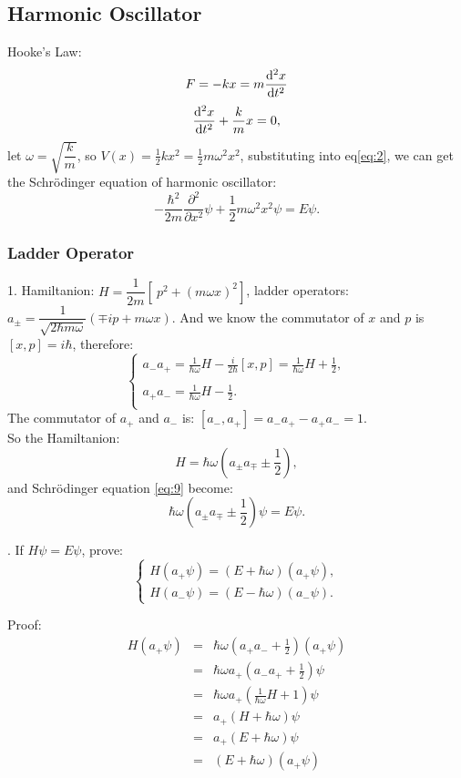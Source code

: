 \documentclass[12pt, 
]{article}
\begin{document}
	\subsection{Harmonic Oscillator}
	Hooke's Law:
	\[
		F=-kx=m\frac{{\rm d}^2x}{{\rm d}t^2}	
	\]
	\[
		\frac{{\rm d}^2 x}{{\rm d}t^2}+\frac{k}{m}x=0,
	\]
	let $\omega=\sqrt{\dfrac{k}{m}}$, so $\displaystyle V(x)=\frac{1}{2}kx^2=\frac{1}{2}m\omega^2x^2$, substituting into eq\eqref{eq:2}, we can get the Schr\"odinger equation of harmonic oscillator:
	\begin{equation}\label{eq:9}
		-\frac{\hbar^2}{2m}\frac{\partial^2}{\partial x^2}\psi+\frac{1}{2}m\omega^2x^2\psi=E\psi.
	\end{equation}
	
	\subsubsection{Ladder Operator}
	1. Hamiltanion: $H=\dfrac{1}{2m}[~p^2+(m\omega x)^2]$, ladder operators: $a_\pm=\dfrac{1}{\sqrt{2\hbar m\omega}}(\mp ip+m\omega x).$
	And we know the commutator of $x$ and $p$ is $[x,p]=i\hbar$, therefore:
	\[
		\left\{
		\begin{array}{l}
			a_{-}a_{+}=\displaystyle \frac{1}{\hbar\omega}H-\frac{i}{2\hbar}[x,p]=\frac{1}{\hbar\omega}H+\frac{1}{2},\\
			~\\
			a_+a_{-}=\displaystyle\frac{1}{\hbar\omega}H-\frac{1}{2}.\\
		\end{array}
		\right.
	\]
	The commutator of $a_{+}$ and $a_{-}$ is: $[a_{-},a_{+}]=a_{-}a_{+}-a_+a_{-}=1$.
	~\\

	\noindent So the Hamiltanion: $$H=\hbar\omega\left (a_\pm a_\mp \pm \frac{1}{2}\right),$$
	and Schr\"odinger equation \eqref{eq:9} become:
	\begin{equation}\label{eq:10}
		\hbar\omega\left (a_\pm a_\mp \pm \frac{1}{2}\right)\psi=E\psi.
	\end{equation}

	. If $H\psi=E\psi$, prove:
	\[
		\left\{
		\begin{array}{l}
			H(a_+\psi)=(E+\hbar\omega)(a_+\psi),\\
			H(a_{-}\psi)=(E-\hbar\omega)(a_{-}\psi).
		\end{array}
		\right.
	\]

\noindent Proof:
\begin{eqnarray*}
	H(a_+\psi)&=&\hbar\omega (a_+a_{-}+\frac{1}{2})(a_+\psi)\\
	&=&\hbar\omega a_+(a_{-}a_++\frac{1}{2})\psi\\
	&=&\hbar\omega a_+(\frac{1}{\hbar\omega}H+1)\psi\\
	&=&a_+(H+\hbar\omega)\psi\\
	&=&a_+(E+\hbar\omega)\psi\\
	&=&(E+\hbar\omega)(a_+\psi)
\end{eqnarray*}
\end{document}
